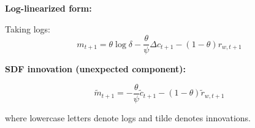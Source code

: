 \documentclass{beamer}
\begin{document}
\begin{frame}[allowframebreaks]
    
    \framebreak
    
    \textbf{Log-linearized form:}
    
    Taking logs:
    \begin{equation*}
        m_{t+1} = \theta \log \delta - \frac{\theta}{\psi} \Delta c_{t+1} - (1-\theta) r_{w,t+1}
    \end{equation*}
    
    \textbf{SDF innovation (unexpected component):}
    \begin{tcolorbox}[colback=green!5!white, colframe=green!75!black, title=SDF Innovation (Wealth Return Form)]
    \begin{equation}
        \tilde{m}_{t+1} = -\frac{\theta}{\psi} \tilde{c}_{t+1} - (1-\theta) \tilde{r}_{w,t+1}\label{消费、财富形式的SDF}
    \end{equation}
    \end{tcolorbox}
    
    where lowercase letters denote logs and tilde denotes innovations.
    
\end{frame}
\end{document}
